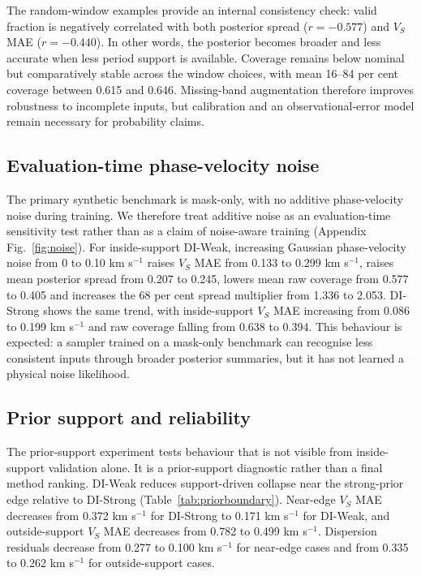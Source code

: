 \documentclass[referee]{gji}
\begin{document}
The random-window examples provide an internal consistency check: valid fraction is negatively correlated with both posterior spread ($r=-0.577$) and $V_S$ MAE ($r=-0.440$). In other words, the posterior becomes broader and less accurate when less period support is available. Coverage remains below nominal but comparatively stable across the window choices, with mean 16--84 per cent coverage between 0.615 and 0.646. Missing-band augmentation therefore improves robustness to incomplete inputs, but calibration and an observational-error model remain necessary for probability claims.

\subsection{Evaluation-time phase-velocity noise}

The primary synthetic benchmark is mask-only, with no additive phase-velocity noise during training. We therefore treat additive noise as an evaluation-time sensitivity test rather than as a claim of noise-aware training (Appendix Fig.~\ref{fig:noise}). For inside-support DI-Weak, increasing Gaussian phase-velocity noise from 0 to 0.10 km s$^{-1}$ raises $V_S$ MAE from 0.133 to 0.299 km s$^{-1}$, raises mean posterior spread from 0.207 to 0.245, lowers mean raw coverage from 0.577 to 0.405 and increases the 68 per cent spread multiplier from 1.336 to 2.053. DI-Strong shows the same trend, with inside-support $V_S$ MAE increasing from 0.086 to 0.199 km s$^{-1}$ and raw coverage falling from 0.638 to 0.394. This behaviour is expected: a sampler trained on a mask-only benchmark can recognise less consistent inputs through broader posterior summaries, but it has not learned a physical noise likelihood.

\subsection{Prior support and reliability}

The prior-support experiment tests behaviour that is not visible from inside-support validation alone. It is a prior-support diagnostic rather than a final method ranking. DI-Weak reduces support-driven collapse near the strong-prior edge relative to DI-Strong (Table~\ref{tab:priorboundary}). Near-edge $V_S$ MAE decreases from 0.372 km s$^{-1}$ for DI-Strong to 0.171 km s$^{-1}$ for DI-Weak, and outside-support $V_S$ MAE decreases from 0.782 to 0.499 km s$^{-1}$. Dispersion residuals decrease from 0.277 to 0.100 km s$^{-1}$ for near-edge cases and from 0.335 to 0.262 km s$^{-1}$ for outside-support cases.
\end{document}
